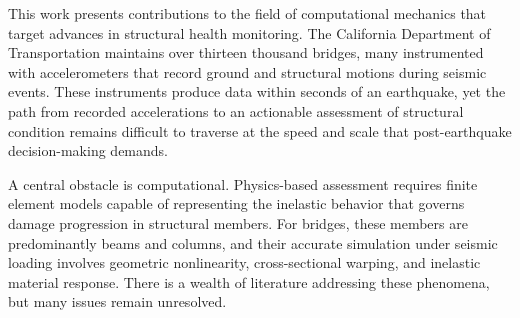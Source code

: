 This work presents contributions to the field of computational mechanics that target advances in structural health monitoring. 
The California Department of Transportation maintains over thirteen thousand bridges, many instrumented with accelerometers that record ground and structural motions during seismic events.
These instruments produce data within seconds of an earthquake, yet the path from recorded accelerations to an actionable assessment of structural condition remains difficult to traverse at the speed and scale that post-earthquake decision-making demands.


A central obstacle is computational.
Physics-based assessment requires finite element models capable of representing the inelastic behavior that governs damage progression in structural members.
For bridges, these members are predominantly beams and columns, and their accurate simulation under seismic loading involves geometric nonlinearity, cross-sectional warping, and inelastic material response.
There is a wealth of literature addressing these phenomena, but many issues remain unresolved. 


